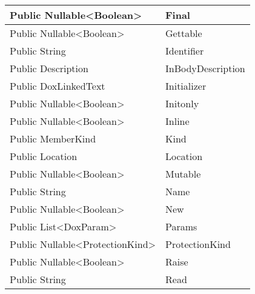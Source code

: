 \documentclass[11pt, oneside, a4paper]{book}
\begin{document}
\begin{center}
\begin{tabular}{| p{3cm} | p{12cm} | }
\hline
 Public  Nullable<Boolean> &  Final\hypertarget{SoftwareEngineeringTools.{}Documentation.{}DoxProperty.{}Final}{}\\
\hline
 Public  Nullable<Boolean> &  Gettable\hypertarget{SoftwareEngineeringTools.{}Documentation.{}DoxProperty.{}Gettable}{}\\
\hline
 Public  String &  Identifier\hypertarget{SoftwareEngineeringTools.{}Documentation.{}DoxProperty.{}Identifier}{}\\
\hline
 Public  Description &  InBodyDescription\hypertarget{SoftwareEngineeringTools.{}Documentation.{}DoxProperty.{}InBodyDescription}{}\\
\hline
 Public  DoxLinkedText &  Initializer\hypertarget{SoftwareEngineeringTools.{}Documentation.{}DoxProperty.{}Initializer}{}\\
\hline
 Public  Nullable<Boolean> &  Initonly\hypertarget{SoftwareEngineeringTools.{}Documentation.{}DoxProperty.{}Initonly}{}\\
\hline
 Public  Nullable<Boolean> &  Inline\hypertarget{SoftwareEngineeringTools.{}Documentation.{}DoxProperty.{}Inline}{}\\
\hline
 Public  MemberKind &  Kind\hypertarget{SoftwareEngineeringTools.{}Documentation.{}DoxProperty.{}Kind}{}\\
\hline
 Public  Location &  Location\hypertarget{SoftwareEngineeringTools.{}Documentation.{}DoxProperty.{}Location}{}\\
\hline
 Public  Nullable<Boolean> &  Mutable\hypertarget{SoftwareEngineeringTools.{}Documentation.{}DoxProperty.{}Mutable}{}\\
\hline
 Public  String &  Name\hypertarget{SoftwareEngineeringTools.{}Documentation.{}DoxProperty.{}Name}{}\\
\hline
 Public  Nullable<Boolean> &  New\hypertarget{SoftwareEngineeringTools.{}Documentation.{}DoxProperty.{}New}{}\\
\hline
 Public  List<DoxParam> &  Params\hypertarget{SoftwareEngineeringTools.{}Documentation.{}DoxProperty.{}Params}{}\\
\hline
 Public  Nullable<ProtectionKind> &  ProtectionKind\hypertarget{SoftwareEngineeringTools.{}Documentation.{}DoxProperty.{}ProtectionKind}{}\\
\hline
 Public  Nullable<Boolean> &  Raise\hypertarget{SoftwareEngineeringTools.{}Documentation.{}DoxProperty.{}Raise}{}\\
\hline
 Public  String &  Read\hypertarget{SoftwareEngineeringTools.{}Documentation.{}DoxProperty.{}Read}{}\\

\end{tabular}
\end{center}
\end{document}
